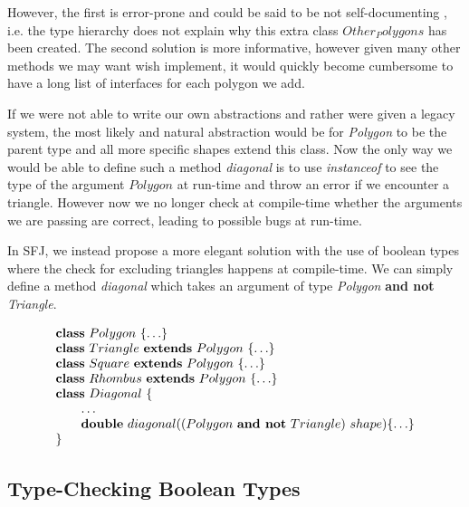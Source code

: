 \documentclass{l4proj}
\begin{document}
However, the first is error-prone and could be said to be not self-documenting \citep{schach2007}, i.e. the type hierarchy does not explain why this extra class $Other_Polygons$ has been created.
The second solution is more informative, however given many other methods we may want wish implement, it would quickly become cumbersome to have a long list of interfaces for each polygon we add.

If we were not able to write our own abstractions and rather were given a legacy system, the most likely and natural abstraction would be for \emph{Polygon} to be the parent type and all more specific shapes extend this class.
Now the only way we would be able to define such a method \emph{diagonal} is to use \emph{instanceof} to see the type of the argument $Polygon$ at run-time and throw an error if we encounter a triangle.
However now we no longer check at compile-time whether the arguments we are passing are correct, leading to possible bugs at run-time.

In SFJ, we instead propose a more elegant solution with the use of boolean types where the check for excluding triangles happens at compile-time.
We can simply define a method \emph{diagonal} which takes an argument of type \emph{Polygon} \textbf{and not} \emph{Triangle}.

\begin{equation}
    \label{eq:polygons}
    \begin{array}{l}
        \synclass Polygon \ \{\ldots\}
        \\
        \syndecl{Triangle}{Polygon} {\ldots}
        \\
        \syndecl{Square}{Polygon} {\ldots}
        \\
        \syndecl{Rhombus}{Polygon} {\ldots}
        \\
        \synclass Diagonal \ \{
        \\
        \qquad \ldots \\
        \qquad \textbf{double}\ diagonal((Polygon\ \textbf{and not}\ Triangle) \ shape)\{\ldots\}
        \\
        \}
    \end{array}
\end{equation}

\subsection{Type-Checking Boolean Types}
\label{typecheck}
\end{document}
